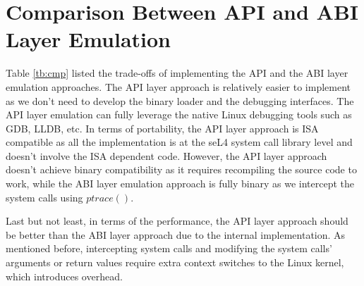 \section{Comparison Between API and ABI Layer Emulation}

Table \ref{tb:cmp} listed the trade-offs of implementing the API and the ABI layer emulation approaches. The API layer approach is relatively easier to implement as we don't need to develop the binary loader and the debugging interfaces. The API layer emulation can fully leverage the native Linux debugging tools such as GDB, LLDB, etc. In terms of portability, the API layer approach is ISA compatible as all the implementation is at the seL4 system call library level and doesn't involve the ISA dependent code. However, the API layer approach doesn't achieve binary compatibility as it requires recompiling the source code to work, while the ABI layer emulation approach is fully binary as we intercept the system calls using $ptrace()$.

Last but not least, in terms of the performance, the API layer approach should be better than the ABI layer approach due to the internal implementation. As mentioned before, intercepting system calls and modifying the system calls' arguments or return values require extra context switches to the Linux kernel, which introduces overhead.

